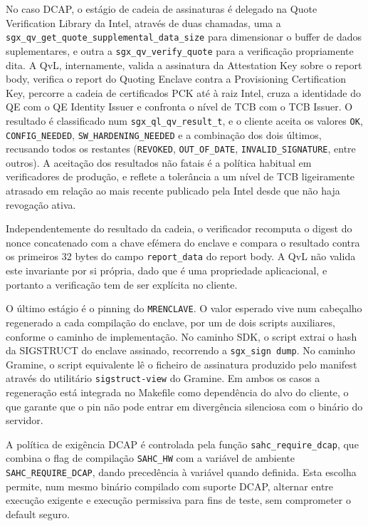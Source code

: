 No caso DCAP, o estágio de cadeia de assinaturas é delegado na Quote Verification Library da Intel, através de duas chamadas, uma a \texttt{sgx\_qv\_get\_}\texttt{quote\_}\texttt{supplemental\_}\texttt{data\_size} para dimensionar o buffer de dados suplementares, e outra a \texttt{sgx\_qv\_verify\_quote} para a verificação propriamente dita. A QvL, internamente, valida a assinatura da Attestation Key sobre o report body, verifica o report do Quoting Enclave contra a Provisioning Certification Key, percorre a cadeia de certificados PCK até à raiz Intel, cruza a identidade do QE com o QE Identity Issuer e confronta o nível de TCB com o TCB Issuer. O resultado é classificado num \texttt{sgx\_ql\_qv\_result\_t}, e o cliente aceita os valores \texttt{OK}, \texttt{CONFIG\_NEEDED}, \texttt{SW\_HARDENING\_NEEDED} e a combinação dos dois últimos, recusando todos os restantes (\texttt{REVOKED}, \texttt{OUT\_OF\_DATE}, \texttt{INVALID\_SIGNATURE}, entre outros). A aceitação dos resultados não fatais é a política habitual em verificadores de produção, e reflete a tolerância a um nível de TCB ligeiramente atrasado em relação ao mais recente publicado pela Intel desde que não haja revogação ativa.

Independentemente do resultado da cadeia, o verificador recomputa o digest do nonce concatenado com a chave efémera do enclave e compara o resultado contra os primeiros 32 bytes do campo \texttt{report\_data} do report body. A QvL não valida este invariante por si própria, dado que é uma propriedade aplicacional, e portanto a verificação tem de ser explícita no cliente.

O último estágio é o pinning do \texttt{MRENCLAVE}. O valor esperado vive num cabeçalho regenerado a cada compilação do enclave, por um de dois scripts auxiliares, conforme o caminho de implementação. No caminho SDK, o script extrai o hash da SIGSTRUCT do enclave assinado, recorrendo a \texttt{sgx\_sign dump}. No caminho Gramine, o script equivalente lê o ficheiro de assinatura produzido pelo manifest através do utilitário \texttt{sigstruct-view} do Gramine. Em ambos os casos a regeneração está integrada no Makefile como dependência do alvo do cliente, o que garante que o pin não pode entrar em divergência silenciosa com o binário do servidor.

A política de exigência DCAP é controlada pela função \texttt{sahc\_require\_dcap}, que combina o flag de compilação \texttt{SAHC\_HW} com a variável de ambiente \texttt{SAHC\_REQUIRE\_DCAP}, dando precedência à variável quando definida. Esta escolha permite, num mesmo binário compilado com suporte DCAP, alternar entre execução exigente e execução permissiva para fins de teste, sem comprometer o default seguro.

